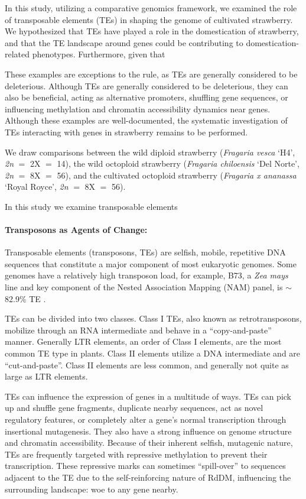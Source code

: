 \documentclass[fleqn,10pt]{olplainarticle}
\begin{document}
In this study, utilizing a comparative genomics framework, we examined the role of transposable elements (TEs) in shaping the genome of cultivated strawberry.
We hypothesized that TEs have played a role in the domestication of strawberry, and that the TE landscape around genes could be contributing to domestication-related phenotypes.
Furthermore, given that 



These examples are exceptions to the rule, as TEs are generally considered to be deleterious.
Although TEs are generally considered to be deleterious, they can also be beneficial, acting as alternative promoters, shuffling gene sequences, or influencing methylation and chromatin accessibility dynamics near genes.
Although these examples are well-documented, the systematic investigation of TEs interacting with genes in strawberry remains to be performed.

We draw comparisons between the wild diploid strawberry (\textit{Fragaria vesca} `H4', \textit{2n} $=$ 2X $=$ 14), the wild octoploid strawberry (\textit{Fragaria chiloensis} `Del Norte', \textit{2n} $=$ 8X $=$ 56), and the cultivated octoploid strawberry (\textit{Fragaria x ananassa} `Royal Royce', \textit{2n} $=$ 8X $=$ 56).

In this study we examine transposable elements


\paragraph{Transposons as Agents of Change:}
Transposable elements (transposons, TEs) are selfish, mobile, repetitive DNA sequences that constitute a major component of most eukaryotic genomes.
Some genomes have a relatively high transposon load, for example, B73, a \textit{Zea mays} line and key component of the Nested Association Mapping (NAM) panel, is $\sim$82.9\% TE \cite{Hufford2021}.

TEs can be divided into two classes.
Class I TEs, also known as retrotransposons, mobilize through an RNA intermediate and behave in a ``copy-and-paste'' manner.
Generally LTR elements, an order of Class I elements, are the most common TE type in plants.
Class II elements utilize a DNA intermediate and are ``cut-and-paste''.
Class II elements are less common, and generally not quite as large as LTR elements.

TEs can influence the expression of genes in a multitude of ways.
TEs can pick up and shuffle gene fragments, duplicate nearby sequences, act as novel regulatory features, or completely alter a gene's normal transcription through insertional mutagenesis.
They also have a strong influence on genome structure and chromatin accessibility.
Because of their inherent selfish, mutagenic nature, TEs are frequently targeted with repressive methylation to prevent their transcription.
These repressive marks can sometimes ``spill-over'' to sequences adjacent to the TE due to the self-reinforcing nature of RdDM, influencing the surrounding landscape: woe to any gene nearby.
\end{document}

